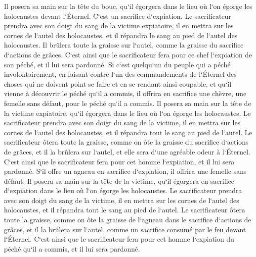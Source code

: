 \verse Il posera sa main sur la tête du bouc, qu`il égorgera dans le lieu où l`on égorge les holocaustes devant l`Éternel. C`est un sacrifice d`expiation. 
\verse Le sacrificateur prendra avec son doigt du sang de la victime expiatoire, il en mettra sur les cornes de l`autel des holocaustes, et il répandra le sang au pied de l`autel des holocaustes. 
\verse Il brûlera toute la graisse sur l`autel, comme la graisse du sacrifice d`actions de grâces. C`est ainsi que le sacrificateur fera pour ce chef l`expiation de son péché, et il lui sera pardonné. 
\verse Si c`est quelqu`un du peuple qui a péché involontairement, en faisant contre l`un des commandements de l`Éternel des choses qui ne doivent point se faire et en se rendant ainsi coupable, 
\verse et qu`il vienne à découvrir le péché qu`il a commis, il offrira en sacrifice une chèvre, une femelle sans défaut, pour le péché qu`il a commis. 
\verse Il posera sa main sur la tête de la victime expiatoire, qu`il égorgera dans le lieu où l`on égorge les holocaustes. 
\verse Le sacrificateur prendra avec son doigt du sang de la victime, il en mettra sur les cornes de l`autel des holocaustes, et il répandra tout le sang au pied de l`autel. 
\verse Le sacrificateur ôtera toute la graisse, comme on ôte la graisse du sacrifice d`actions de grâces, et il la brûlera sur l`autel, et elle sera d`une agréable odeur à l`Éternel. C`est ainsi que le sacrificateur fera pour cet homme l`expiation, et il lui sera pardonné. 
\verse S`il offre un agneau en sacrifice d`expiation, il offrira une femelle sans défaut. 
\verse Il posera sa main sur la tête de la victime, qu`il égorgera en sacrifice d`expiation dans le lieu où l`on égorge les holocaustes. 
\verse Le sacrificateur prendra avec son doigt du sang de la victime, il en mettra sur les cornes de l`autel des holocaustes, et il répandra tout le sang au pied de l`autel. 
\verse Le sacrificateur ôtera toute la graisse, comme on ôte la graisse de l`agneau dans le sacrifice d`actions de grâces, et il la brûlera sur l`autel, comme un sacrifice consumé par le feu devant l`Éternel. C`est ainsi que le sacrificateur fera pour cet homme l`expiation du péché qu`il a commis, et il lui sera pardonné. 

